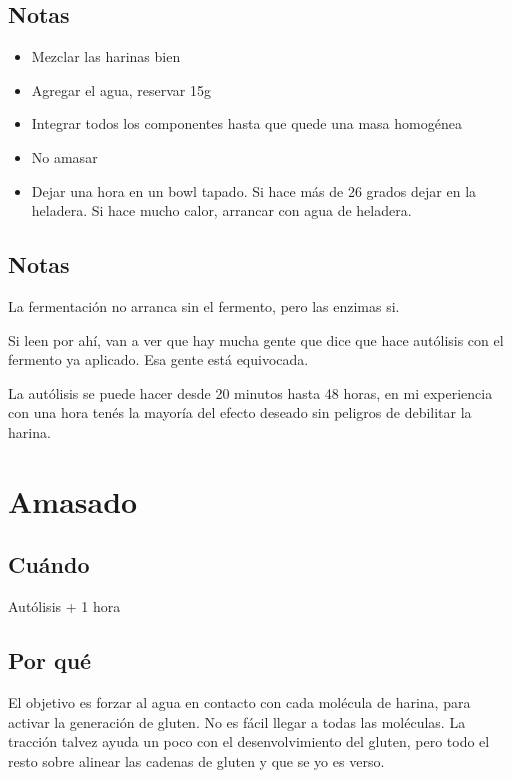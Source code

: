 \documentclass[10pt,a4paper]{article}
\begin{document}
\subsection*{Notas}
\begin{itemize}
\item Mezclar las harinas bien
\item Agregar el agua, reservar 15g
\item Integrar todos los componentes hasta que quede una masa homogénea
\item No amasar
\item Dejar una hora en un bowl tapado. Si hace más de 26 grados dejar en la
  heladera. Si hace mucho calor, arrancar con agua de heladera.
\end{itemize}

\subsection*{Notas}
La fermentación no arranca sin el fermento, pero las enzimas si.

Si leen por ahí, van a ver que hay mucha gente que dice que hace autólisis con
el fermento ya aplicado. Esa gente está equivocada.

La autólisis se puede hacer desde 20 minutos hasta 48 horas, en mi
experiencia con una hora tenés la mayoría del efecto deseado sin
peligros de debilitar la harina.

\section{Amasado}
\subsection*{Cuándo}
Autólisis + 1 hora

\subsection*{Por qué}
El objetivo es forzar al agua en contacto con cada molécula
de harina, para activar la generación de gluten. No es fácil
llegar a todas las moléculas. La tracción talvez ayuda un poco
con el desenvolvimiento del gluten, pero todo el resto sobre alinear
las cadenas de gluten y que se yo es verso.
\end{document}
